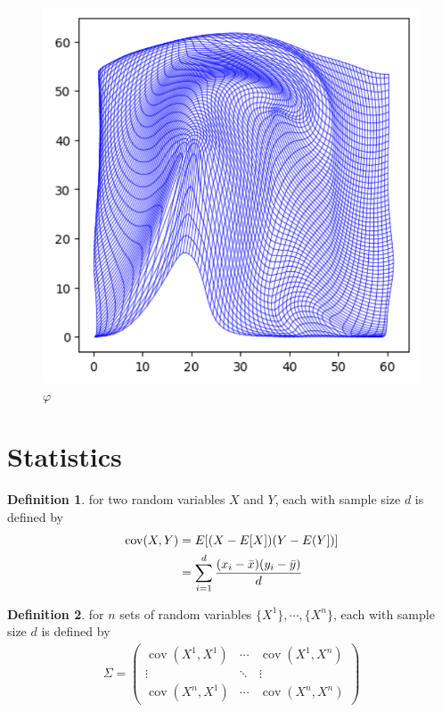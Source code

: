 \documentclass[a4paper]{article}
\theoremstyle{definition}
\newtheorem{definition}{Definition}
\theoremstyle{plain}
\begin{document}
\begin{figure}[H]
\centering
\includegraphics[scale=0.6]{figure/diffeo.png}
\caption{$\varphi$}
\end{figure}

\section{Statistics}

\begin{definition}
 for two random variables $X$ and $Y$, each with sample size $d$ is defined by
\begin{align*}
    \operatorname{cov}(X,Y)&=E[(X-E[X])(Y-E(Y])]\\
    &=\sum^d_{i=1}\frac{(x_i-\Bar{x})(y_i-\Bar{y})}{d}
\end{align*}
\end{definition}

\begin{definition}
 for $n$ sets of random variables $\{X^1\},\cdots,\{X^n\}$, each with sample size $d$ is defined by
\begin{align*}
    \Sigma=
    \begin{pmatrix}
        \operatorname{cov}(X^1,X^1) & \cdots & \operatorname{cov}(X^1,X^n)\\
        \vdots &  \ddots &  \vdots \\
        \operatorname{cov}(X^n,X^1) & \cdots & \operatorname{cov}(X^n,X^n)
    \end{pmatrix}
\end{align*}
\end{definition}
\end{document}
